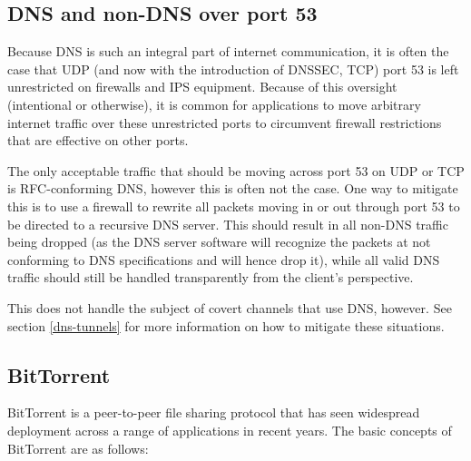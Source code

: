 \documentclass{article}
\theoremstyle{remark}
\theoremstyle{definition}
\theoremstyle{definition}
\theoremstyle{definition}
\begin{document}
\subsection{DNS and non-DNS over port 53}
\label{dns-techniques}

Because DNS is such an integral part of internet communication, it is often the case that UDP (and now with the introduction of DNSSEC, TCP) port 53 is left unrestricted on firewalls and IPS equipment. Because of this oversight (intentional or otherwise), it is common for applications to move arbitrary internet traffic over these unrestricted ports to circumvent firewall restrictions that are effective on other ports.

The only acceptable traffic that should be moving across port 53 on UDP or TCP is RFC-conforming DNS, however this is often not the case. One way to mitigate this is to use a firewall to rewrite all packets moving in or out through port 53 to be directed to a recursive DNS server. This should result in all non-DNS traffic being dropped (as the DNS server software will recognize the packets at not conforming to DNS specifications and will hence drop it), while all valid DNS traffic should still be handled transparently from the client's perspective.

This does not handle the subject of covert channels that use DNS, however. See section \ref{dns-tunnels} for more information on how to mitigate these situations.

\subsection{BitTorrent}
BitTorrent is a peer-to-peer file sharing protocol that has seen widespread deployment across a range of applications in recent years. The basic concepts of BitTorrent are as follows:
\end{document}
